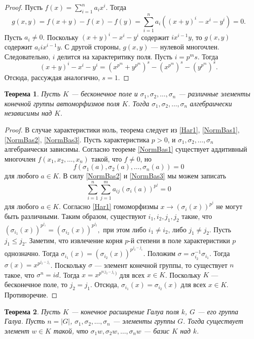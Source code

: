 \documentclass[12pt, titlepage, oneside]{amsbook}
\newtheorem{theorem}{Теорема}[chapter]
\theoremstyle{definition}
\theoremstyle{remark}
\begin{document}
\begin{proof}
Пусть $f(x)=\sum\limits_{i=1}^n a_i x^i$. Тогда $$g(x,y)=f(x+y)-f(x)-f(y)=\sum\limits_{i=1}^n a_i ((x+y)^i-x^i-y^i)=0.$$ Пусть $a_i\neq 0$. Поскольку $(x+y)^i-x^i-y^i$ содержит $ix^{i-1}y$, то $g(x,y)$ содержит $a_i ix^{i-1}y$. С другой стороны, $g(x,y)$ --- нулевой многочлен. Следовательно, $i$ делится на характеритику поля. Пусть $i=p^ms$. Тогда $$(x+y)^i-x^i-y^i=(x^{p^m}+y^{p^m})^s-(x^{p^m})^s-(y^{p^m})^s.$$ Отсюда, рассуждая аналогично, $s=1$.
\end{proof}

\begin{theorem}
\label{NormBas4}
Пусть $K$ --- бесконечное поле и $\sigma_1,\sigma_2,\ldots,\sigma_n$ --- различные элементы конечной группы автоморфизмов поля $K$. Тогда $\sigma_1,\sigma_2,\ldots,\sigma_n$ алгебраически независимы над $K$.
\end{theorem}

\begin{proof}
В случае характеристики ноль, теорема следует из \ref{Har1}, \ref{NormBas1}, \ref{NormBas2}, \ref{NormBas3}. Пусть характеристика $p>0$, и $\sigma_1,\sigma_2,\ldots,\sigma_n$ алгебраически зависимы. Согласно теореме \ref{NormBas1} существует аддитивный многочлен $f(x_1,x_2,\ldots,x_n)$ такой, что $f\neq 0$, но $$f(\sigma_1(a),\sigma_2(a),\ldots,\sigma_n(a))=0$$ для любого $a\in K$. В силу \ref{NormBas2} и \ref{NormBas3} мы можем записать $$\sum\limits_{i=1}^n\sum\limits_{j=1}^m a_{ij}(\sigma_i(a))^{p^j}=0$$  для любого $a\in K$. Согласно \ref{Har1} гомоморфизмы $x\rightarrow (\sigma_i(x))^{p^j}$ не могут быть различными. Таким образом, существуют $i_1,i_2,j_1,j_2$ такие, что $(\sigma_{i_1}(x))^{p^{j_1}}=(\sigma_{i_2}(x))^{p^{j_2}},$ при этом либо $i_1\neq i_2$, либо $j_1\neq j_2$. Пусть $j_1\leq j_2$. Заметим, что извлечение корня $p$-й степени в поле характеристики $p$ однозначно. Тогда $\sigma_{i_1}(x)=(\sigma_{i_2}(x))^{p^{j_2-j_1}}.$ Положим $\sigma=\sigma^{-1}_{i_2}\sigma_{i_1}$. Тогда $\sigma(x)=x^{p^{j_2-j_1}}$. Поскольку $\sigma$ --- элемент конечной группы, то существует $n$ такое, что $\sigma^n=id$. Тогда $x=x^{p^{n(j_2-j_1})}$ для всех $x\in K$. Поскольку $K$ --- бесконечное поле, то $j_2=j_1$. Отсюда, $\sigma_{i_1}(x)=\sigma_{i_2}(x)$ для всех $x\in K$. Противоречие.
\end{proof}


\begin{theorem}
\label{NormBas5}
Пусть $K$ --- конечное расширение Галуа поля $k$, $G$ --- его группа Галуа. Пусть $n=|G|$, $\sigma_1,\sigma_2,\ldots,\sigma_n$ --- элементы группы $G$. Тогда существует элемент $w\in K$ такой, что $\sigma_1 w,\sigma_2 w,\ldots,\sigma_n w$ --- базис $K$ над $k$.
\end{theorem}
\end{document}
